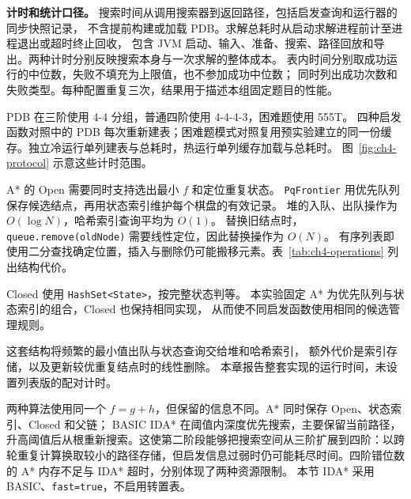 \textbf{计时和统计口径。}
搜索时间从调用搜索器到返回路径，包括启发查询和运行器的同步快照记录，
不含提前构建或加载 PDB。求解总耗时从启动求解进程前计至进程退出或超时终止回收，
包含 JVM 启动、输入、准备、搜索、路径回放和导出。两种计时分别反映搜索本身与一次求解的整体成本。
表内时间分别取成功运行的中位数，失败不填充为上限值，也不参加成功中位数；
同时列出成功次数和失败类型。每种配置重复三次，结果用于描述本组固定题目的性能。

PDB 在三阶使用 4-4 分组，普通四阶使用 4-4-4-3，困难题使用 555T。
四种启发函数对照中的 PDB 每次重新建表；困难题模式对照复用预实验建立的同一份缓存。独立冷运行单列建表与总耗时，热运行单列缓存加载与总耗时。
图~\ref{fig:ch4-protocol} 示意这些计时范围。
\FloatBarrier

\par\vspace{2bp}

A* 的 Open 需要同时支持选出最小 $f$ 和定位重复状态。
\texttt{PqFrontier} 用优先队列保存候选结点，再用状态索引维护每个棋盘的有效记录。
堆的入队、出队操作为 $O(\log N)$，哈希索引查询平均为 $O(1)$。
替换旧结点时，\texttt{queue.remove(oldNode)} 需要线性定位，因此替换操作为 $O(N)$。
有序列表即使用二分查找确定位置，插入与删除仍可能搬移元素。表~\ref{tab:ch4-operations} 列出结构代价。

Closed 使用 \texttt{HashSet<State>}，按完整状态判等。
本实验固定 A* 为优先队列与状态索引的组合，Closed 也保持相同实现，
从而使不同启发函数使用相同的候选管理规则。

这套结构将频繁的最小值出队与状态查询交给堆和哈希索引，
额外代价是索引存储，以及更新较优重复结点时的线性删除。
本章报告整套实现的运行时间，未设置列表版的配对计时。
\FloatBarrier

\par\vspace{2bp}

两种算法使用同一个 $f=g+h$，但保留的信息不同。A* 同时保存 Open、状态索引、Closed 和父链；
BASIC IDA* 在阈值内深度优先搜索，主要保留当前路径，升高阈值后从根重新搜索。这使第二阶段能够把搜索空间从三阶扩展到四阶：以跨轮重复计算换取较小的路径存储，但启发信息过弱时仍可能耗尽时间。四阶错位数的 A* 内存不足与 IDA* 超时，分别体现了两种资源限制。
本节 IDA* 采用 BASIC、\texttt{fast=true}，不启用转置表。

